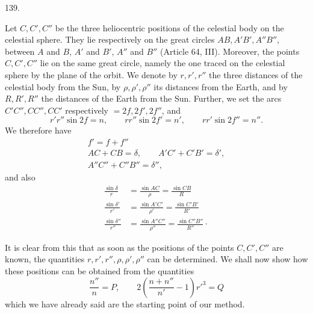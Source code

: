 \par{}\medskip
\begin{center}\hypertarget{native-186-article139}{}139.\end{center}
Let $C,C',C''$ be the three heliocentric positions of the celestial body on the celestial sphere.
They lie respectively on the great circles $AB,A'B',A''B''$, between $A$ and $B$, $A'$ and $B'$,
$A''$ and $B''$ (Article 64, III). Moreover, the points $C,C',C''$ lie on the same great circle,
namely the one traced on the celestial sphere by the plane of the orbit. We denote by $r,r',r''$ the
three distances of the celestial body from the Sun, by $\rho,\rho',\rho''$ its distances from the Earth, and
by $R,R',R''$ the distances of the Earth from the Sun. Further, we set the arcs $C'C'',CC'',CC'$ respectively
$=2f,2f',2f''$, and
\[
r'r''\sin2f=n,\qquad rr''\sin2f'=n',\qquad rr'\sin2f''=n''.
\]
\hypertarget{native-187}{}We therefore have
\[
\begin{gathered}
f'=f+f''\\[.4ex]
AC+CB=\delta,\qquad A'C'+C'B'=\delta',\\[.4ex]
A''C''+C''B''=\delta'',
\end{gathered}
\]
and also
\[
\begin{aligned}
\frac{\sin\delta}{r}&=\frac{\sin AC}{\rho}=\frac{\sin CB}{R}\\[.7ex]
\frac{\sin\delta'}{r'}&=\frac{\sin A'C'}{\rho'}=\frac{\sin C'B'}{R'}\\[.7ex]
\frac{\sin\delta''}{r''}&=\frac{\sin A''C''}{\rho''}=\frac{\sin C''B''}{R''}\mathpunct{\cdot}
\end{aligned}
\]

It is clear from this that as soon as the positions of the points $C,C',C''$ are known, the
quantities $r,r',r'',\rho,\rho',\rho''$ can be determined. We shall now show how these positions can be obtained from
the quantities
\[
\frac{n''}{n}=P,\qquad 2\left(\frac{n+n''}{n'}-1\right)r'^3=Q
\]
which we have already said are the starting point of our method.
